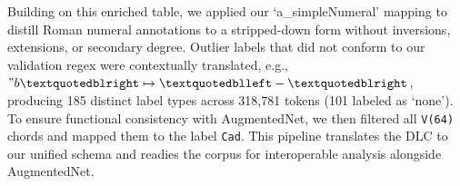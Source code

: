 \documentclass[sigconf]{acmart} %
\begin{document}
Building on this enriched table, we applied our `a\_simpleNumeral' mapping to distill Roman numeral annotations to a stripped-down form without inversions, extensions, or secondary degree. Outlier labels that did not conform to our validation regex were contextually translated, e.g., $"b” \mapsto “-”$, producing 185 distinct label types across 318,781 tokens (101 labeled as `none'). To ensure functional consistency with AugmentedNet, we then filtered all \texttt{V(64)} chords and mapped them to the label \texttt{Cad}. This pipeline translates the DLC to our unified schema and readies the corpus for interoperable analysis alongside AugmentedNet.



\end{document}
